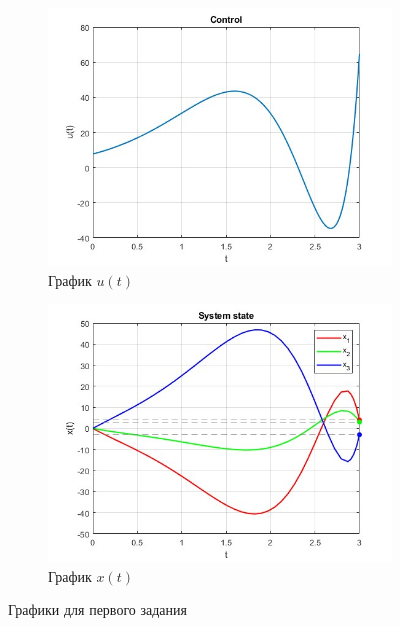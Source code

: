 \documentclass[a4paper, 12pt]{article}
\begin{document}
    \begin{figure}[H]
        \centering
        \begin{subfigure}{0.45\textwidth}
            \centering
            \includegraphics[width=\linewidth]{task_1_u_t.jpg}
            \caption{График $u(t)$}
            \label{fig:task_1_u_t}
        \end{subfigure}
        \hfill
        \begin{subfigure}{0.45\textwidth}
            \centering
            \includegraphics[width=\linewidth]{task_1_x_t.jpg}
            \caption{График $x(t)$}
            \label{fig:task_1_x_t}
        \end{subfigure}
        \caption{Графики для первого задания}
        \label{fig:task_1_modeling}
    \end{figure}
\end{document}
